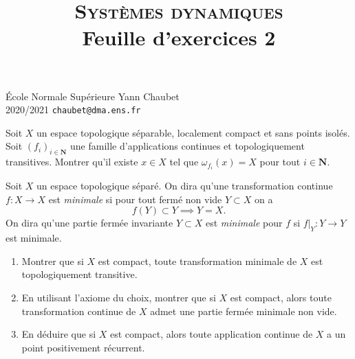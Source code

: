 \documentclass[a4paper,10pt,openany]{article}
\title{\textsc{Syst\`emes dynamiques} \\ Feuille d'exercices 2}
\date{}
\author{}
\theoremstyle{plain}
\theoremstyle{definition}
\newcommand{\N}{\mathbf{N}}
\begin{document}
{\noindent \'Ecole Normale Sup\'erieure  \hfill Yann Chaubet } \\
{2020/2021 \hfill \texttt{chaubet@dma.ens.fr}}

{\let\newpage\relax\maketitle}
\maketitle
{} \vspace{0.15cm}

\noindent Soit $X$ un espace topologique s\'eparable, localement compact et sans points isol\'es. Soit $(f_i)_{i \in \N}$ une famille d'applications continues et topologiquement transitives. Montrer qu'il existe $x \in X$ tel que $\omega_{f_i}(x) = X$ pour tout $i \in \N$.

\vspace{0.6cm}

 \vspace{1.5mm}

\noindent Soit $X$ un espace topologique s\'epar\'e. On dira qu'une transformation continue $f : X \to X$ est \textit{minimale} si 
pour tout ferm\'e non vide $Y \subset X$ on a 
$$
f(Y) \subset Y \implies Y = X.
$$
On dira qu'une partie ferm\'ee invariante $Y \subset X$ est \textit{minimale} pour $f$ si $f|_Y : Y \to Y$ est minimale.
\begin{enumerate}
\item Montrer que si $X$ est compact, toute transformation minimale de $X$ est topologiquement transitive.
\item En utilisant l'axiome du choix, montrer que si $X$ est compact, alors toute transformation continue de $X$ admet une partie ferm\'ee minimale non vide.
\item En d\'eduire que si $X$ est compact, alors toute application continue de $X$ a un point positivement r\'ecurrent.
\end{enumerate}
\vspace{0.6cm}

 \vspace{1.5mm} 
\end{document}
